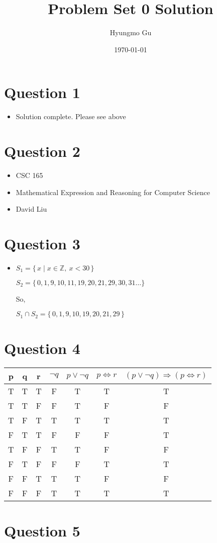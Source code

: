 \documentclass[12pt]{article}
\begin{document}
\title{Problem Set 0 Solution}
\author{Hyungmo Gu}
\date{\today}
\maketitle

\section*{Question 1}
    \begin{itemize}
        \item Solution complete. Please see above
    \end{itemize}

\section*{Question 2}
    \begin{itemize}
        \item CSC 165
        \item Mathematical Expression and Reasoning for Computer Science
        \item David Liu
    \end{itemize}

\section*{Question 3}
    \begin{itemize}
        \item
            $S_1 = \{\,x \mid x \in \mathbb{Z},\:x < 30\,\}$

            $S_2 = \{\,0, 1, 9, 10, 11, 19, 20, 21, 29, 30, 31 \dotsc\}$

            So,

            $S_1 \cap S_2 = \{\,0, 1, 9, 10, 19, 20, 21, 29\,\}$


    \end{itemize}


\section*{Question 4}
    \begin{tabular}{c | c | c | c | c | c | c}
        p & q & r & $\neg q$ & $p \lor \neg q $ & $p \iff r$ & $(p \lor \neg q) \Rightarrow (p \iff r)$ \\
        \hline
        T & T & T & F & T & T & T \\
        T & T & F & F & T & F & F \\
        T & F & T & T & T & T & T \\
        F & T & T & F & F & F & T \\
        T & F & F & T & T & F & F \\
        F & T & F & F & F & T & T \\
        F & F & T & T & T & F & F \\
        F & F & F & T & T & T & T \\
        \hline
    \end{tabular}


\section*{Question 5}
\end{document}
